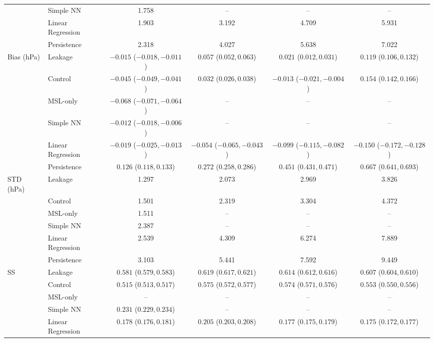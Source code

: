 \begin{table}[htbp]
{\begin{tabular}{llcccc}
 & Simple NN & 1.758 & -- & -- & -- \\
 & Linear Regression & 1.903 & 3.192 & 4.709 & 5.931 \\
 & Persistence & 2.318 & 4.027 & 5.638 & 7.022 \\
\midrule
Bias (hPa) & Leakage & $-0.015$ ($-0.018, -0.011$) & $0.057$ ($0.052, 0.063$) & $0.021$ ($0.012, 0.031$) & $0.119$ ($0.106, 0.132$) \\
 & Control & $-0.045$ ($-0.049, -0.041$) & $0.032$ ($0.026, 0.038$) & $-0.013$ ($-0.021, -0.004$) & $0.154$ ($0.142, 0.166$) \\
 & MSL-only & $-0.068$ ($-0.071, -0.064$) & -- & -- & -- \\
 & Simple NN & $-0.012$ ($-0.018, -0.006$) & -- & -- & -- \\
 & Linear Regression & $-0.019$ ($-0.025, -0.013$) & $-0.054$ ($-0.065, -0.043$) & $-0.099$ ($-0.115, -0.082$) & $-0.150$ ($-0.172, -0.128$) \\
 & Persistence & $0.126$ ($0.118, 0.133$) & $0.272$ ($0.258, 0.286$) & $0.451$ ($0.431, 0.471$) & $0.667$ ($0.641, 0.693$) \\
\midrule
STD (hPa) & Leakage & 1.297 & 2.073 & 2.969 & 3.826 \\
 & Control & 1.501 & 2.319 & 3.304 & 4.372 \\
 & MSL-only & 1.511 & -- & -- & -- \\
 & Simple NN & 2.387 & -- & -- & -- \\
 & Linear Regression & 2.539 & 4.309 & 6.274 & 7.889 \\
 & Persistence & 3.103 & 5.441 & 7.592 & 9.449 \\
\midrule
SS & Leakage & $0.581$ ($0.579, 0.583$) & $0.619$ ($0.617, 0.621$) & $0.614$ ($0.612, 0.616$) & $0.607$ ($0.604, 0.610$) \\
 & Control & $0.515$ ($0.513, 0.517$) & $0.575$ ($0.572, 0.577$) & $0.574$ ($0.571, 0.576$) & $0.553$ ($0.550, 0.556$) \\
 & MSL-only & -- & -- & -- & -- \\
 & Simple NN & $0.231$ ($0.229, 0.234$) & -- & -- & -- \\
 & Linear Regression & $0.178$ ($0.176, 0.181$) & $0.205$ ($0.203, 0.208$) & $0.177$ ($0.175, 0.179$) & $0.175$ ($0.172, 0.177$) \\
\bottomrule
\end{tabular}%
}
\endgroup
\end{table}
